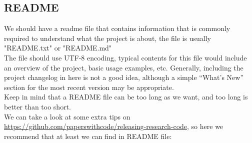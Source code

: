 \documentclass[a4paper]{article}
\begin{document}
		\subsection{README}
			We should have a readme file that contains information that is commonly required to understand what the project is about, the file is usually  "README.txt" or "README.md"\\
			The file should use UTF-8 encoding, typical contents for this file would include an overview of the project, basic usage examples, etc. Generally, including the project changelog in here is not a good idea, although a simple “What's New” section for the most recent version may be appropriate.\\
			Keep in mind that a README file can be too long as we want, and too long is better than too short.\\
			We can take a look at some extra tips on \url{https://github.com/paperswithcode/releasing-research-code}, so here we recommend that at least we can find in README file:
\end{document}
